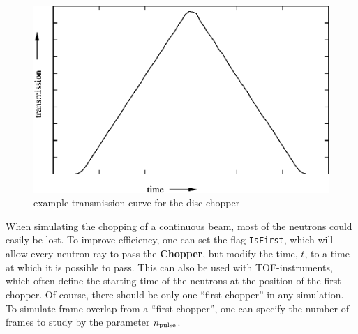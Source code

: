 \begin{figure}[ht]
\includegraphics[width=1.0\linewidth]{figures/tracho.eps}
\caption{example transmission curve for the disc chopper\label{f:chopper2}}
\end{figure}    

When simulating the chopping of a continuous beam,
most of the neutrons could easily be lost.
To improve efficiency, one can set the flag \verb+IsFirst+, which will
allow every neutron ray to pass the {\bf Chopper}, but modify the 
time, $t$, to a time at which it is possible to pass. 
This can also be used with TOF-instruments, which often
define the starting time of the neutrons at
the position of the first chopper.
Of course, there should be only one ``first chopper'' in
any simulation.
To simulate frame overlap from a ``first chopper'', one can specify 
the number of frames to study by the parameter $n_{\rm pulse}$.